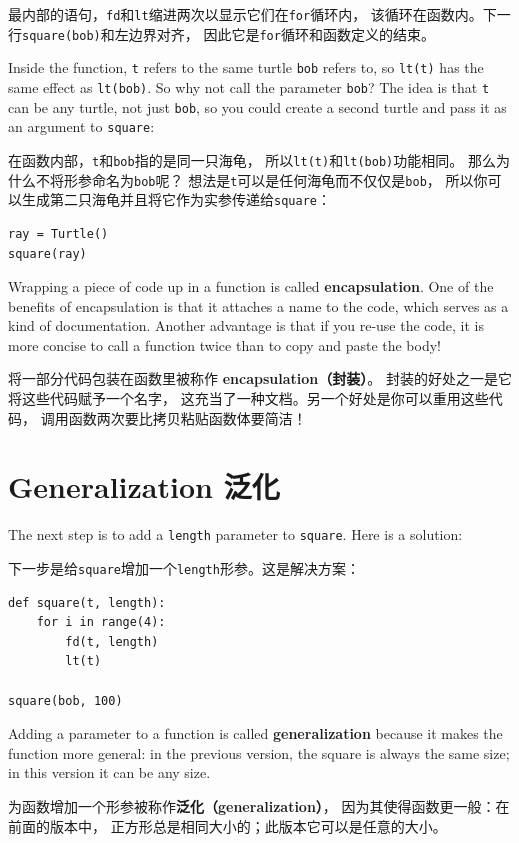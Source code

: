 \documentclass[10pt]{book}
\begin{document}
\begin{CJK}{UTF8}{gbsn}
最内部的语句，{\tt fd}和{\tt lt}缩进两次以显示它们在{\tt for}循环内，
该循环在函数内。下一行{\tt square(bob)}和左边界对齐，
因此它是{\tt for}循环和函数定义的结束。

Inside the function, {\tt t} refers to the same turtle {\tt bob}
refers to, so {\tt lt(t)} has the same effect as {\tt lt(bob)}.
So why not call the parameter {\tt bob}?  The idea is that {\tt t}
can be any turtle, not just {\tt bob}, so you could create
a second turtle and pass it as an argument to {\tt square}:

在函数内部，{\tt t}和{\tt bob}指的是同一只海龟，
所以{\tt lt(t)}和{\tt lt(bob)}功能相同。
那么为什么不将形参命名为{\tt bob}呢？
想法是{\tt t}可以是任何海龟而不仅仅是{\tt bob}，
所以你可以生成第二只海龟并且将它作为实参传递给{\tt square}：

\begin{verbatim}
ray = Turtle()
square(ray)
\end{verbatim}
%
Wrapping a piece of code up in a function is called {\bf
encapsulation}.  One of the benefits of encapsulation is that it
attaches a name to the code, which serves as a kind of documentation.
Another advantage is that if you re-use the code, it is more concise
to call a function twice than to copy and paste the body!

将一部分代码包装在函数里被称作 {\bf encapsulation（封装）}。
封装的好处之一是它将这些代码赋予一个名字，
这充当了一种文档。另一个好处是你可以重用这些代码，
调用函数两次要比拷贝粘贴函数体要简洁！

\section{Generalization 泛化}

The next step is to add a {\tt length} parameter to {\tt square}.
Here is a solution:

下一步是给{\tt square}增加一个{\tt length}形参。这是解决方案：

\begin{verbatim}
def square(t, length):
    for i in range(4):
        fd(t, length)
        lt(t)

square(bob, 100)
\end{verbatim}
%
Adding a parameter to a function is called {\bf generalization}
because it makes the function more general: in the previous
version, the square is always the same size; in this version
it can be any size.

为函数增加一个形参被称作{\bf 泛化（generalization）}，
因为其使得函数更一般：在前面的版本中，
正方形总是相同大小的；此版本它可以是任意的大小。


\end{CJK}
\end{document}
